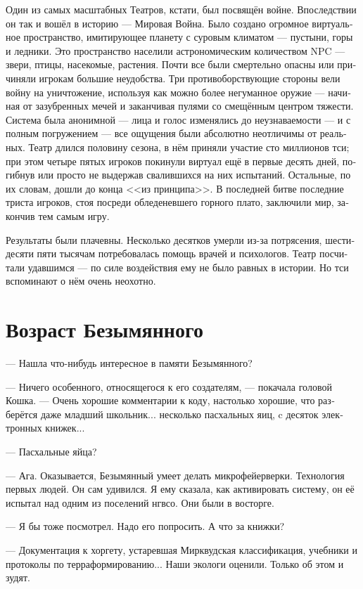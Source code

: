 \documentclass[a4paper,12pt,fleqn]{book}\usepackage{cooltooltips}\usepackage{polyglossia}\setdefaultlanguage[babelshorthands=true]{russian}\setotherlanguage{english}\defaultfontfeatures{Ligatures=TeX,Mapping=tex-text} \usepackage{xcolor}\definecolor{lightgray}{HTML}{bbbbbb}\color{lightgray}\newcommand{\ml}[3]{\textenglish{\textcolor{black}{#3}}}
\begin{document}
{Один из самых масштабных Театров, кстати, был посвящён войне.
Впоследствии он так и вошёл в историю --- Мировая Война.
Было создано огромное виртуальное пространство, имитирующее планету с суровым климатом --- пустыни, горы и ледники.
Это пространство населили астрономическим количеством NPC --- звери, птицы, насекомые, растения.
Почти все были смертельно опасны или причиняли игрокам большие неудобства.
Три противоборствующие стороны вели войну на уничтожение, используя как можно более негуманное оружие --- начиная от зазубренных мечей и заканчивая пулями со смещённым центром тяжести.
Система была анонимной --- лица и голос изменялись до неузнаваемости --- и с полным погружением --- все ощущения были абсолютно неотличимы от реальных.
Театр длился половину сезона, в нём приняли участие сто миллионов тси;
при этом четыре пятых игроков покинули виртуал ещё в первые десять дней, погибнув или просто не выдержав свалившихся на них испытаний.
Остальные, по их словам, дошли до конца <<из принципа>>.
В последней битве последние триста игроков, стоя посреди обледеневшего горного плато, заключили мир, закончив тем самым игру.

Результаты были плачевны.
Несколько десятков умерли из-за потрясения, шестидесяти пяти тысячам потребовалась помощь врачей и психологов.
Театр посчитали удавшимся --- по силе воздействия ему не было равных в истории.
Но тси вспоминают о нём очень неохотно.

\section{Возраст Безымянного}

--- Нашла что-нибудь интересное в памяти Безымянного?

--- Ничего особенного, относящегося к его создателям, --- покачала головой Кошка.
--- Очень хорошие комментарии к коду, настолько хорошие, что разберётся даже младший школьник... несколько пасхальных яиц, c десяток электронных книжек...

--- Пасхальные яйца?

--- Ага.
Оказывается, Безымянный умеет делать микрофейерверки.
Технология первых людей.
Он сам удивился.
Я ему сказала, как активировать систему, он её испытал над одним из поселений нгвсо.
Они были в восторге.

--- Я бы тоже посмотрел.
Надо его попросить.
А что за книжки?

--- Документация к хоргету, устаревшая Мирквудская классификация, учебники и протоколы по терраформированию...
Наши экологи оценили.
Только об этом и зудят.

}
\end{document}
